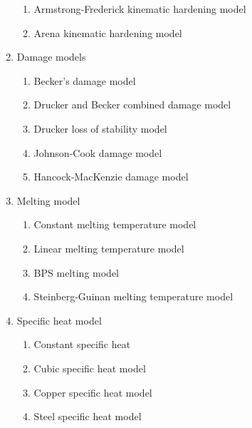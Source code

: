 \begin{enumerate}
\begin{enumerate}
    \item Armstrong-Frederick kinematic hardening model
    \item Arena kinematic hardening model
  \end{enumerate}
  \item Damage models
  \begin{enumerate}
    \item Becker's damage model
    \item Drucker and Becker combined damage model
    \item Drucker loss of stability model
    \item Johnson-Cook damage model
    \item Hancock-MacKenzie damage model
  \end{enumerate}
  \item Melting model
  \begin{enumerate}
    \item Constant melting temperature model
    \item Linear melting temperature model
    \item BPS melting model
    \item Steinberg-Guinan melting temperature model
  \end{enumerate}
  \item Specific heat model 
  \begin{enumerate}
    \item Constant specific heat
    \item Cubic specific heat model
    \item Copper specific heat model
    \item Steel specific heat model
  \end{enumerate}
\end{enumerate}



